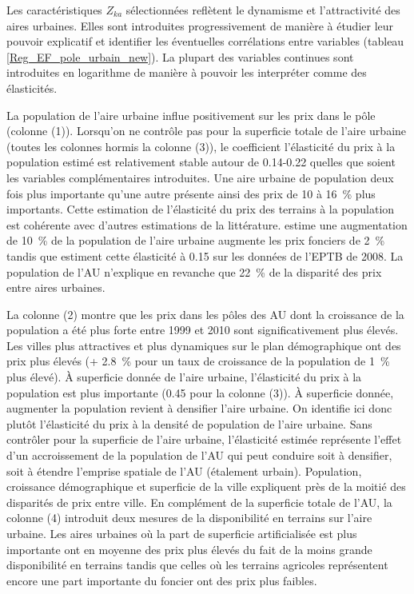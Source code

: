 \documentclass[10.5pt,a4paper]{article}
\begin{document}
{Les caractéristiques $Z_{ka}$ sélectionnées reflètent le dynamisme et l'attractivité des aires urbaines. Elles sont introduites progressivement de manière à étudier leur pouvoir explicatif et identifier les éventuelles corrélations entre variables (tableau \ref{Reg_EF_pole_urbain_new}). La plupart des variables continues sont introduites en logarithme de manière à pouvoir les interpréter comme des élasticités.\par    

La population de l'aire urbaine influe positivement sur les prix dans le pôle (colonne (1)). Lorsqu'on ne contrôle pas pour la superficie totale de l'aire urbaine (toutes les colonnes hormis la colonne (3)), le coefficient l'élasticité du prix à la population estimé est relativement stable autour de 0.14-0.22 quelles que soient les variables complémentaires introduites. Une aire urbaine de population deux fois plus importante qu'une autre présente ainsi des prix de 10 à 16~\% plus importants. Cette estimation de l'élasticité du prix des terrains à la population est cohérente avec d'autres estimations de la littérature. \cite{Goffette09} estime une augmentation de 10~\% de la population de l’aire urbaine augmente les prix fonciers de 2~\% tandis que \cite{Combes_etal11} estiment cette élasticité à 0.15 sur les données de l'EPTB de 2008.  La population de l'AU n'explique en revanche que 22~\% de la disparité des prix entre aires urbaines. \par  


%
\begin{landscape}

\end{landscape}

La colonne (2) montre que les prix dans les pôles des AU dont la croissance de la population a été plus forte entre 1999 et 2010 sont significativement plus élevés. Les villes plus attractives et plus dynamiques sur le plan démographique ont des prix plus élevés (+ 2.8~\%  pour un taux de croissance de la population de 1~\% plus élevé). \`{A} superficie donnée de l'aire urbaine, l'élasticité du prix à la population est plus importante (0.45 pour la colonne (3)). \`{A} superficie donnée, augmenter la population revient à densifier l'aire urbaine. On identifie ici donc plutôt l'élasticité du prix à la densité de population de l'aire urbaine. Sans contrôler pour la superficie de l'aire urbaine, l’élasticité estimée représente l'effet d'un accroissement de la population de l'AU qui peut conduire soit à densifier, soit à étendre l'emprise spatiale de l'AU (étalement urbain). Population, croissance démographique et superficie de la ville expliquent près de la moitié des disparités de prix entre ville. En complément de la superficie totale de l'AU, la colonne (4) introduit deux mesures  de la disponibilité en terrains sur l'aire urbaine. Les aires urbaines où la part de superficie artificialisée est plus importante ont en moyenne des prix plus élevés du fait de la moins grande disponibilité en terrains tandis que celles où les terrains agricoles représentent encore une part importante du foncier ont des prix plus faibles. \par   

}
\end{document}
